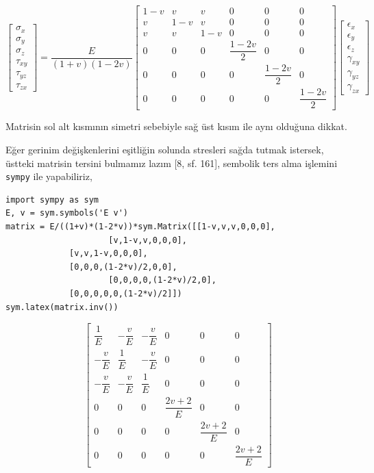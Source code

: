 \documentclass[12pt,fleqn]{article}\usepackage{../../common}
\begin{document}
$$
\left[\begin{array}{c}
\sigma_x \\ \sigma_y \\ \sigma_z \\ \tau_{xy} \\ \tau_{yz} \\ \tau_{zx}
\end{array}\right] =
\frac{E}{(1+v)(1-2v)}
\left[\begin{array}{cccccc}
1-v &  v  &  v  &            0      &               0  &  0  \\
 v  & 1-v &  v  &            0      &               0  &  0  \\
 v  &  v  & 1-v &            0      &               0  &  0  \\
 0  &  0  &  0  & \dfrac{1-2v}{2}   &               0  &  0  \\
 0  &  0  &  0  &            0      &  \dfrac{1-2v}{2} &  0  \\
 0  &  0  &  0  &            0      &               0  &  \dfrac{1-2v}{2} 
\end{array}\right]
\left[\begin{array}{c}
\epsilon_x \\ \epsilon_y \\ \epsilon_z \\ \gamma_{xy} \\ \gamma_{yz} \\ \gamma_{zx}
\end{array}\right]
$$

Matrisin sol alt kısmının simetri sebebiyle sağ üst kısım ile aynı olduğuna
dikkat.

Eğer gerinim değişkenlerini eşitliğin solunda stresleri sağda tutmak istersek,
üstteki matrisin tersini bulmamız lazım [8, sf. 161], sembolik ters alma
işlemini \verb!sympy! ile yapabiliriz,

\begin{verbatim}
import sympy as sym
E, v = sym.symbols('E v')
matrix = E/((1+v)*(1-2*v))*sym.Matrix([[1-v,v,v,0,0,0],
                     [v,1-v,v,0,0,0],
		     [v,v,1-v,0,0,0],
		     [0,0,0,(1-2*v)/2,0,0],
                     [0,0,0,0,(1-2*v)/2,0],
		     [0,0,0,0,0,(1-2*v)/2]])
sym.latex(matrix.inv())
\end{verbatim}


$$
\left[\begin{matrix}\dfrac{1}{E} & - \dfrac{v}{E} & - \dfrac{v}{E} & 0 & 0 & 0\\- \dfrac{v}{E} & \dfrac{1}{E} & - \dfrac{v}{E} & 0 & 0 & 0\\- \dfrac{v}{E} & - \dfrac{v}{E} & \dfrac{1}{E} & 0 & 0 & 0\\0 & 0 & 0 & \dfrac{2 v + 2}{E} & 0 & 0\\0 & 0 & 0 & 0 & \dfrac{2 v + 2}{E} & 0\\0 & 0 & 0 & 0 & 0 & \dfrac{2 v + 2}{E}\end{matrix}\right]
$$
\end{document}
